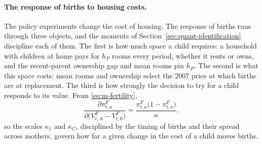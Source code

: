 \paragraph{The response of births to housing costs.}
The policy experiments change the cost of housing. The response of births
runs through three objects, and the moments of
Section~\ref{sec:quant-identification} discipline each of them. The first
is how much space a child requires: a household with children at
home pays for $h_P$ rooms every period, whether it rents or owns, and the
recent-parent ownership gap and mean rooms pin $h_P$. The second is what
this space costs: mean rooms and ownership select the 2007 price at which
births are at replacement. The third is how strongly the decision to try
for a child responds to its value. From \eqref{eq:m-fertility},
\begin{equation*}
 \frac{\partial\pi^F_{t,a}}{\partial\bigl(V^F_{t,A}-V^F_{t,0}\bigr)}
 =\frac{\pi^F_{t,a}\bigl(1-\pi^F_{t,a}\bigr)}{\kappa},
\end{equation*}
so the scales $\kappa_1$ and $\kappa_C$, disciplined by the timing of births
and their spread across mothers, govern how far a given change in the cost of
a child moves births.
